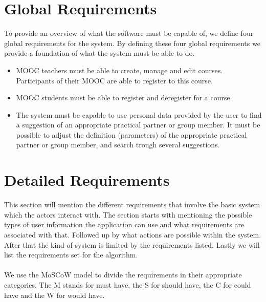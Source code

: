 \section{Global Requirements}
To provide an overview of what the software must be capable of, we define four global requirements for the system.
By defining these four global requirements we provide a foundation of what the system must be able to do.
\begin{itemize}
\item  MOOC teachers must be able to create, manage and edit courses.
Participants of their MOOC are able to register to this course.

\item MOOC students must be able to register and deregister for a course.

\item The system must be capable to use personal data provided by the user to find a suggestion of an appropriate practical partner or group member.
It must be possible to adjust the definition (parameters) of the appropriate practical partner or group member, and search trough several suggestions.
\end{itemize}

\section{Detailed Requirements}
This section will mention the different requirements that involve the basic system which the actors interact with.
The section starts with mentioning the possible types of user information the application can use and what requirements are associated with that.
Followed up by what actions are possible within the system.
After that the kind of system is limited by the requirements listed.
Lastly we will list the requirements set for the algorithm.
\\\\
We use the MoSCoW model to divide the requirements in their appropriate categories.
The M stands for must have, the S for should have, the C for could have and the W for would have.


